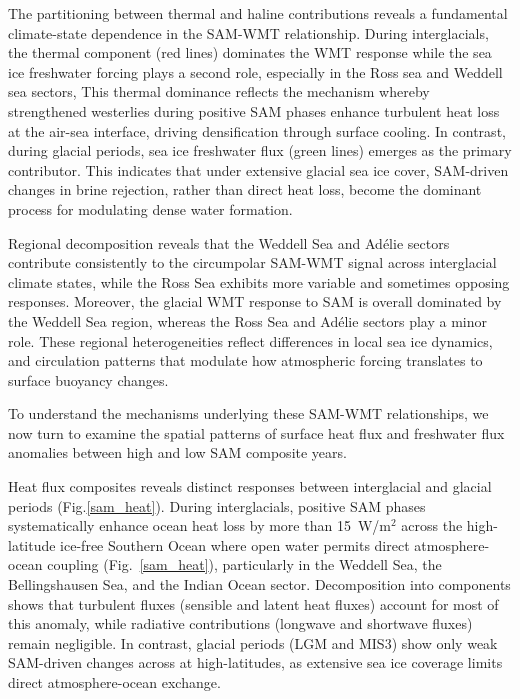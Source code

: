 \documentclass[draft]{agujournal2025}
\begin{document}
The partitioning between thermal and haline contributions reveals a fundamental  climate-state dependence in the SAM-WMT relationship. During interglacials, the thermal component (red lines) dominates the WMT response while the sea ice freshwater forcing plays a second role, especially in the Ross sea and Weddell sea sectors,  This thermal dominance reflects the mechanism whereby strengthened westerlies during positive SAM phases enhance turbulent heat loss at the air-sea interface, driving densification through surface cooling. In contrast, during glacial periods, sea ice freshwater flux (green lines) emerges as the primary contributor. This indicates that under extensive glacial sea ice cover, SAM-driven changes in brine rejection, rather than direct heat loss, become the dominant process for modulating dense water formation.

Regional decomposition reveals that the Weddell Sea and Ad\'elie sectors contribute consistently to the circumpolar SAM-WMT signal across interglacial climate states, while the Ross Sea exhibits more variable and sometimes opposing responses. Moreover, the glacial WMT response to SAM is overall dominated by the Weddell Sea region, whereas the Ross Sea and Ad\'elie sectors play a minor role. These regional  heterogeneities reflect differences in local sea ice dynamics, and circulation patterns that modulate how atmospheric forcing translates to surface
  buoyancy changes.


To understand the mechanisms underlying these SAM-WMT relationships, we now turn to examine the spatial patterns of surface heat flux and freshwater flux anomalies between high and low SAM composite years.

Heat flux composites reveals  distinct responses between interglacial and glacial periods (Fig.\ref{sam_heat}). During interglacials, positive SAM phases systematically enhance ocean heat loss by more than 15~W/m$^2$ across the high-latitude ice-free  Southern Ocean where open water permits direct atmosphere-ocean coupling  (Fig.~\ref{sam_heat}), particularly in the Weddell Sea, the Bellingshausen Sea, and the Indian Ocean sector. Decomposition into components shows that turbulent fluxes (sensible and latent heat fluxes) account for most of this anomaly, while radiative contributions (longwave and shortwave fluxes) remain negligible.  In contrast, glacial periods (LGM and MIS3) show only weak SAM-driven changes across at high-latitudes, as extensive sea ice coverage limits direct atmosphere-ocean exchange.
\end{document}
